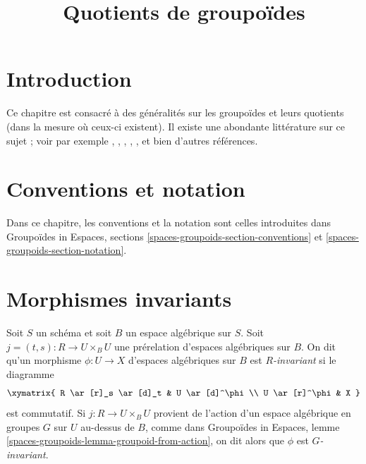 

%


\title{Quotients de groupoïdes}


\maketitle

\label{section-phantom}

\tableofcontents

\section{Introduction}
\label{section-introduction}

\noindent
Ce chapitre est consacré à des généralités sur les groupoïdes et leurs
quotients (dans la mesure où ceux-ci existent).
Il existe une abondante littérature sur ce sujet ; voir par exemple
\cite{GIT}, \cite{seshadri_quotients}, \cite{KollarQuotients},
\cite{K-M}, \cite{KollarFinite}, et bien d'autres références.






\section{Conventions et notation}
\label{section-conventions-notation}

\noindent
Dans ce chapitre, les conventions et la notation sont celles introduites dans
Groupoïdes in Espaces, sections \ref{spaces-groupoids-section-conventions}
et \ref{spaces-groupoids-section-notation}.


\section{Morphismes invariants}
\label{section-invariant}

\begin{definition}
\label{definition-invariant}
Soit $S$ un schéma et soit $B$ un espace algébrique sur $S$.
Soit $j = (t, s) : R \to U \times_B U$ une prérelation d'espaces
algébriques sur $B$. On dit qu'un morphisme $\phi : U \to X$ d'espaces algébriques
sur $B$ est {\it $R$-invariant} si le diagramme
$$
\xymatrix{
R \ar[r]_s \ar[d]_t & U \ar[d]^\phi \\
U \ar[r]^\phi & X
}
$$
est commutatif. Si $j : R \to U \times_B U$ provient de l'action
d'un espace algébrique en groupes $G$ sur $U$ au-dessus de $B$, comme dans
Groupoïdes in Espaces, lemme \ref{spaces-groupoids-lemma-groupoid-from-action},
on dit alors que $\phi$ est {\it $G$-invariant}.
\end{definition}

